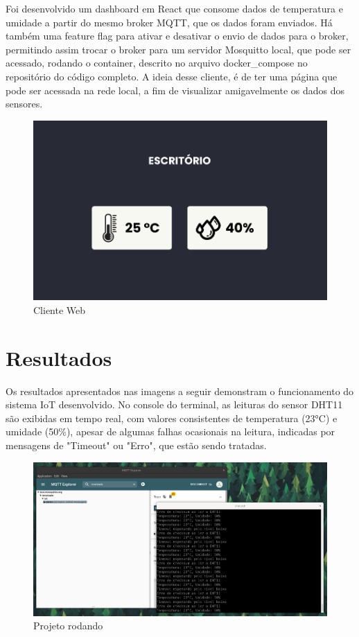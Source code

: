 \documentclass[12pt]{article}
\begin{document}
Foi desenvolvido um dashboard em React que consome dados de temperatura e umidade a partir do mesmo broker MQTT, que os dados foram enviados. Há também uma feature flag para ativar e desativar o envio de dados para o broker, permitindo assim trocar o broker para um servidor Mosquitto local, que pode ser acessado, rodando o container, descrito no arquivo docker\_compose no repositório do código completo. A ideia desse cliente, é de ter uma página que pode ser acessada na rede local, a fim de visualizar amigavelmente os dados dos sensores.

\begin{figure}[ht]
  \centering
  \includegraphics[width=.5\textwidth]{assets/img/client.png}
  \caption{Cliente Web}
\end{figure}

\section{Resultados}

Os resultados apresentados nas imagens a seguir demonstram o funcionamento do sistema IoT desenvolvido. No console do terminal, as leituras do sensor DHT11 são exibidas em tempo real, com valores consistentes de temperatura (23°C) e umidade (50\%), apesar de algumas falhas ocasionais na leitura, indicadas por mensagens de "Timeout" ou "Erro", que estão sendo tratadas.

\begin{figure}[ht]
  \centering
  \includegraphics[width=.7\textwidth]{assets/img/results1.png}
  \caption{Projeto rodando}
\end{figure}
\end{document}
